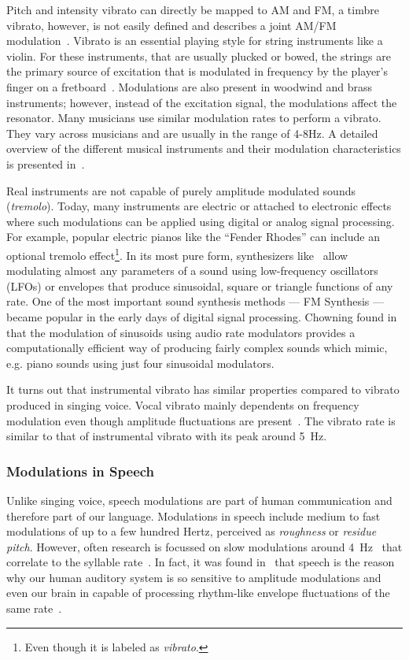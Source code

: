 Pitch and intensity vibrato can directly be mapped to AM and FM, a timbre vibrato, however, is not easily defined and describes a joint AM/FM modulation~\cite{desain99}.
Vibrato is an essential playing style for string instruments like a violin. 
For these instruments, that are usually plucked or bowed, the strings are the primary source of excitation that is modulated in frequency by the player's finger on a fretboard~\cite{macleod06}.
Modulations are also present in woodwind and brass instruments; however, instead of the excitation signal, the modulations affect the resonator.
Many musicians use similar modulation rates to perform a vibrato.
They vary across musicians and are usually in the range of 4-8\si{\hertz}.
A detailed overview of the different musical instruments and their modulation characteristics is presented in~\cite{fletcher01}.
\par
Real instruments are not capable of purely amplitude modulated sounds (\emph{tremolo}). 
Today, many instruments are electric or attached to electronic effects where such modulations can be applied using digital or analog signal processing.
For example, popular electric pianos like the ``Fender Rhodes'' can include an optional tremolo effect\footnote{Even though it is labeled as \emph{vibrato}.}.
In its most pure form, synthesizers like~\cite{pinch09, buchla05} allow modulating almost any parameters of a sound using low-frequency oscillators (LFOs) or envelopes that produce sinusoidal, square or triangle functions of any rate.
One of the most important sound synthesis methods --- FM Synthesis --- became popular in the early days of digital signal processing. 
Chowning found in~\cite{chowning73} that the modulation of sinusoids using audio rate modulators provides a computationally efficient way of producing fairly complex sounds which mimic, e.g. piano sounds using just four sinusoidal modulators.
\par
It turns out that instrumental vibrato has similar properties compared to vibrato produced in singing voice.
Vocal vibrato mainly dependents on frequency modulation even though amplitude fluctuations are present~\cite{sundberg94}. 
The vibrato rate is similar to that of instrumental vibrato with its peak around 5~\si{\hertz}.

\subsubsection*{Modulations in Speech}

Unlike singing voice, speech modulations are part of human communication and therefore part of our language.
Modulations in speech include medium to fast modulations of up to a few hundred Hertz, perceived as \emph{roughness} or \emph{residue pitch}.
However, often research is focussed on slow modulations around 4~\si{\hertz}~\cite{greenberg97, fuellgrabe09} that correlate to the syllable rate~\cite{plomp83, houtgast85}.
In fact, it was found in~\cite{joris04} that speech is the reason why our human auditory system is so sensitive to amplitude modulations and even our brain in capable of processing rhythm-like envelope fluctuations of the same rate~\cite{schreiner88, plomp83}.

